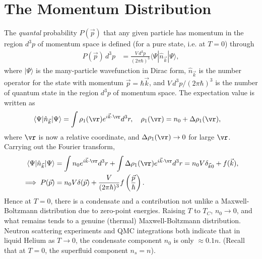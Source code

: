 \documentclass[qo.tex]{subfiles}
\begin{document}
\section{The Momentum Distribution}
The \emph{quantal} probability $P(\vec{p})$ that any given particle has momentum in the region $d^3p$ of momentum space is defined (for a pure state, i.e. at $T=0$) through
\begin{align}
    P(\vec{p})\,d^3p &= \frac{V\,d^3p}{(2\pi\hbar)^3}\langle\Psi|\hat{n}_{\vec{k}}|\Psi\rangle,
\end{align}
where $|\Psi\rangle$ is the many-particle wavefunction in Dirac form, $\hat{n}_{\vec{k}}$ is the number operator for the state with momentum $\vec{p}=\hbar\vec{k}$, and $V\,d^3p/(2\pi\hbar)^3$ is the number of quantum state in the region $d^3p$ of momentum space.
The expectation value is written as
\begin{align}
    \langle\Psi|\hat{n}_{\vec{k}}|\Psi\rangle &= \int \rho_1(\vr)e^{i\vec{k}\cdot\vr}d^3r, \quad \rho_1(\vr) = n_0 + \Delta\rho_1(\vr),
\end{align}
where $\vr$ is now a relative coordinate, and $\Delta\rho_1(\vr)\to0$ for large $\vr$.
Carrying out the Fourier transform,
\begin{align}
    \langle\Psi|\hat{n}_{\vec{k}}|\Psi\rangle &= \int n_0e^{i\vec{k}\cdot\vr}d^3r + \int \Delta\rho_1(\vr)e^{i\vec{k}\cdot\vr}d^3r = n_0V\delta_{\vec{k}0} + f(\vec{k}),\\
    \implies P(\vec{p}) &= n_0V\delta(\vec{p}) + \frac{V}{(2\pi\hbar)^3}f\left(\frac{\vec{p}}{\hbar}\right).
\end{align}
Hence at $T=0$, there is a condensate and a contribution not unlike a Maxwell-Boltzmann distribution due to zero-point energies.
Raising $T$ to $T_C$, $n_0\to0$, and what remains tends to a genuine (thermal) Maxwell-Boltzmann distribution.
Neutron scattering experiments and QMC integrations both indicate that in liquid Helium as $T\to0$, the condensate component $n_0$ is only $\approx0.1n$.
(Recall that at $T=0$, the superfluid component $n_s=n$).
\end{document}
